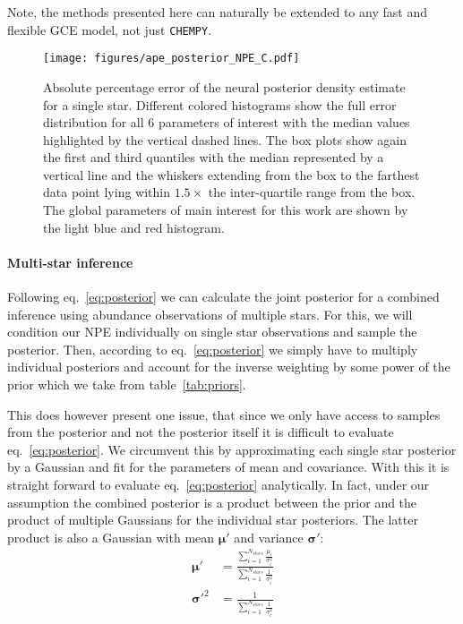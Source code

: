\documentclass{aa}
\begin{document}
Note, the methods presented here can naturally be extended to any fast and flexible GCE model, not just \texttt{CHEMPY}.


\begin{figure}[]
     \centering
     \texttt{[image: figures/ape\_posterior\_NPE\_C.pdf]}
     \vspace{-.5cm}
     \caption{Absolute percentage error of the neural posterior density estimate for a single star. Different colored histograms show the full error distribution for all 6 parameters of interest with the median values highlighted by the vertical dashed lines. The box plots show again the first and third quantiles with the median represented by a vertical line and the whiskers extending from the box to the farthest data point lying within $1.5\times$ the inter-quartile range from the box. The global parameters of main interest for this work are shown by the light blue and red histogram.}
     \label{fig:posterior_APE}
\end{figure}

\paragraph{Multi-star inference}
Following eq.~\ref{eq:posterior} we can calculate the joint posterior for a combined inference using abundance observations of multiple stars. For this, we will condition our NPE individually on single star observations and sample the posterior. Then, according to eq.~\ref{eq:posterior} we simply have to multiply individual posteriors and account for the inverse weighting by some power of the prior which we take from table~\ref{tab:priors}. 

This does however present one issue, that since we only have access to samples from the posterior and not the posterior itself it is difficult to evaluate eq.~\ref{eq:posterior}. We circumvent this by approximating each single star posterior by a Gaussian and fit for the parameters of mean and covariance. With this it is straight forward to evaluate eq.~\ref{eq:posterior} analytically. In fact, under our assumption the combined posterior is a product between the prior and the product of multiple Gaussians for the individual star posteriors. The latter product is also a Gaussian with mean $\mathbf{\mu'}$ and variance $\mathbf{\sigma'}$:
\begin{align}
    \mathbf{\mu'} &= \frac{\sum_{i=1}^{N_{stars}} \frac{\mu_i}{\sigma_i^2}}{\sum_{i=1}^{N_{stars}} \frac1{\sigma_i^2}} \\
\mathbf{\sigma'}^2 &= \frac1 {\sum_{i=1}^{N_{stars}} \frac1{\sigma_i^2}}
\end{align}
\end{document}
